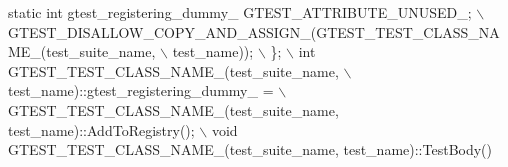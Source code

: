 \begin{DoxyCode}
\textcolor{preprocessor}{    static int gtest\_registering\_dummy\_ GTEST\_ATTRIBUTE\_UNUSED\_;               \(\backslash\)}
\textcolor{preprocessor}{    GTEST\_DISALLOW\_COPY\_AND\_ASSIGN\_(GTEST\_TEST\_CLASS\_NAME\_(test\_suite\_name,    \(\backslash\)}
\textcolor{preprocessor}{                                                           test\_name));        \(\backslash\)}
\textcolor{preprocessor}{  \};                                                                           \(\backslash\)}
\textcolor{preprocessor}{  int GTEST\_TEST\_CLASS\_NAME\_(test\_suite\_name,                                  \(\backslash\)}
\textcolor{preprocessor}{                             test\_name)::gtest\_registering\_dummy\_ =            \(\backslash\)}
\textcolor{preprocessor}{      GTEST\_TEST\_CLASS\_NAME\_(test\_suite\_name, test\_name)::AddToRegistry();     \(\backslash\)}
\textcolor{preprocessor}{  void GTEST\_TEST\_CLASS\_NAME\_(test\_suite\_name, test\_name)::TestBody()}
\end{DoxyCode}
